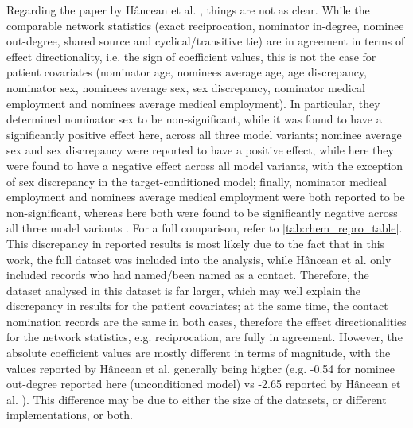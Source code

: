 Regarding the paper by H\^ancean et al. \cite{hancean2022occupations}, things are not as clear. While the comparable network statistics (exact reciprocation, nominator in-degree, nominee out-degree, shared source and cyclical/transitive tie) are in agreement in terms of effect directionality, i.e. the sign of coefficient values, this is not the case for patient covariates (nominator age, nominees average age, age discrepancy, nominator sex, nominees average sex, sex discrepancy, nominator medical employment and nominees average medical employment). In particular, they determined nominator sex to be non-significant, while it was found to have a significantly positive effect here, across all three model variants; nominee average sex and sex discrepancy were reported to have a positive effect, while here they were found to have a negative effect across all model variants, with the exception of sex discrepancy in the target-conditioned model; finally, nominator medical employment and nominees average medical employment were both reported to be non-significant, whereas here both were found to be significantly negative across all three model variants \cite{hancean2022occupations}. For a full comparison, refer to \ref{tab:rhem_repro_table}. This discrepancy in reported results is most likely due to the fact that in this work, the full dataset was included into the analysis, while H\^ancean et al. only included records who had named/been named as a contact. Therefore, the dataset analysed in this dataset is far larger, which may well explain the discrepancy in results for the patient covariates; at the same time, the contact nomination records are the same in both cases, therefore the effect directionalities for the network statistics, e.g. reciprocation, are fully in agreement. However, the absolute coefficient values are mostly different in terms of magnitude, with the values reported by H\^ancean et al. generally being higher (e.g. -0.54 for nominee out-degree reported here (unconditioned model) vs -2.65 reported by H\^ancean et al. \cite{hancean2022occupations}). This difference may be due to either the size of the datasets, or different implementations, or both.

